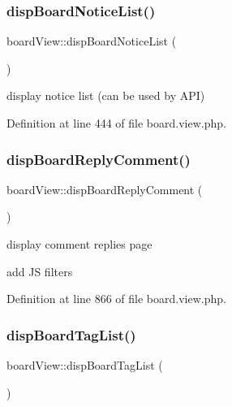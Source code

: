 \subsubsection{\texorpdfstring{disp\+Board\+Notice\+List()}{dispBoardNoticeList()}}
{\footnotesize\ttfamily board\+View\+::disp\+Board\+Notice\+List (\begin{DoxyParamCaption}{ }\end{DoxyParamCaption})}



display notice list (can be used by A\+PI) 



Definition at line 444 of file board.\+view.\+php.

\hypertarget{classboardView_a3259609489d067b85899ba4c8581f25b}{}\label{classboardView_a3259609489d067b85899ba4c8581f25b} 
\subsubsection{\texorpdfstring{disp\+Board\+Reply\+Comment()}{dispBoardReplyComment()}}
{\footnotesize\ttfamily board\+View\+::disp\+Board\+Reply\+Comment (\begin{DoxyParamCaption}{ }\end{DoxyParamCaption})}



display comment replies page 

add JS filters

Definition at line 866 of file board.\+view.\+php.

\hypertarget{classboardView_a4619a8b099e5acb4c1c4e9022a445da4}{}\label{classboardView_a4619a8b099e5acb4c1c4e9022a445da4} 
\subsubsection{\texorpdfstring{disp\+Board\+Tag\+List()}{dispBoardTagList()}}
{\footnotesize\ttfamily board\+View\+::disp\+Board\+Tag\+List (\begin{DoxyParamCaption}{ }\end{DoxyParamCaption})}



